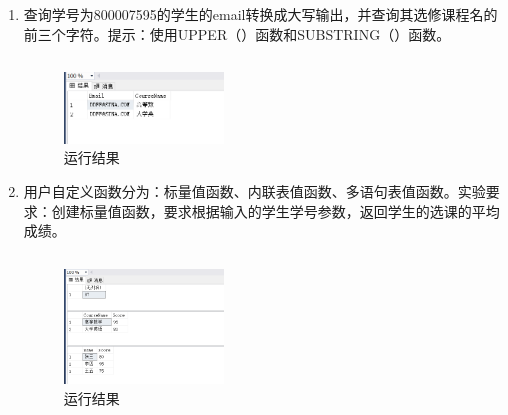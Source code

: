 \documentclass[a4paper,twoside]{article}
\begin{document}
\begin{spacing}{1.2}
\begin{enumerate}
  \item 查询学号为800007595的学生的email转换成大写输出，并查询其选修课程名的前三个字符。提示：使用UPPER（）函数和SUBSTRING（）函数。
\inputminted[firstline=178,lastline=182]{sql}{../code/1.sql}
\begin{figure}[h]
  \centering
  \caption{运行结果}
  \includegraphics[width=0.4\textwidth]{images/8.png}
\end{figure}
  \item 用户自定义函数分为：标量值函数、内联表值函数、多语句表值函数。实验要求：创建标量值函数，要求根据输入的学生学号参数，返回学生的选课的平均成绩。
\inputminted[firstline=186,lastline=227]{sql}{../code/1.sql}
\begin{figure}[h]
  \centering
  \caption{运行结果}
  \includegraphics[width=0.4\textwidth]{images/9.png}
\end{figure}


\end{enumerate}
\end{spacing}
\end{document}
